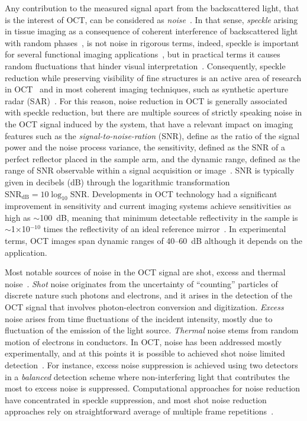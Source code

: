 Any contribution to the measured signal apart from the backscattered light, that is the interest of OCT, can be considered as \textit{noise}~\cite{Izatt2015_Theory}. In that sense, \textit{speckle} arising in tissue imaging as a consequence of coherent interference of backscattered light with random phases~\cite{Goodman2007_Speckle}, is not noise in rigorous terms, indeed, speckle is important for several functional imaging applications~\cite{Wang2007_Three, Lee2012_Dynamic, Liu2013_Quantitative}, but in practical terms it causes random fluctuations that hinder visual interpretation~\cite{Schmitt1999_Speckle}. Consequently, speckle reduction while preserving visibility of fine structures is an active area of research in OCT~\cite{Cuartas-Velez2018_Volumetric} and in most coherent imaging techniques, such as synthetic aperture radar (SAR)~\cite{Argenti2013_Tutorial}. For this reason, noise reduction in OCT is generally associated with speckle reduction, but there are multiple sources of strictly speaking noise in the OCT signal induced by the system, that have a relevant impact on imaging features such as the \textit{signal-to-noise-ration} (SNR), define as the ratio of the signal power and the noise process variance, the sensitivity, defined as the SNR of a perfect reflector placed in the sample arm, and the dynamic range, defined as the range of SNR observable within a signal acquisition or image~\cite{Izatt2015_Theory, deBoer2003_Improved}. SNR is typically given in decibels (dB) through the logarithmic transformation $\text{SNR}_{\text{dB}} = 10\log_{10}\text{SNR}$. Developments in OCT technology had a significant improvement in sensitivity and current imaging systems achieve sensitivities as high as $\sim$100~dB, meaning that minimum detectable reflectivity in the sample is $\sim$1$\times$10$^{-10}$ times the reflectivity of an ideal reference mirror~\cite{Izatt2015_Theory}. In experimental terms, OCT images span dynamic ranges of 40--60~dB although it depends on the application.

Most notable sources of noise in the OCT signal are shot, excess and thermal noise~\cite{deBoer2003_Improved}. \textit{Shot} noise originates from the uncertainty of ``counting'' particles of discrete nature such photons and electrons, and it arises in the detection of the OCT signal that involves photon-electron conversion and digitization. \textit{Excess} noise arises from time fluctuations of the incident intensity, mostly due to fluctuation of the emission of the light source. \textit{Thermal} noise stems from random motion of electrons in conductors. In OCT, noise has been addressed mostly experimentally, and at this points it is possible to achieved shot noise limited detection~\cite{deBoer2003_Improved}. For instance, excess noise suppression is achieved using two detectors in a \textit{balanced} detection scheme where non-interfering light that contributes the most to excess noise is suppressed. Computational approaches for noise reduction have concentrated in speckle suppression, and most shot noise reduction approaches rely on straightforward average of multiple frame repetitions~\cite{Baumann2019_Signal}.

